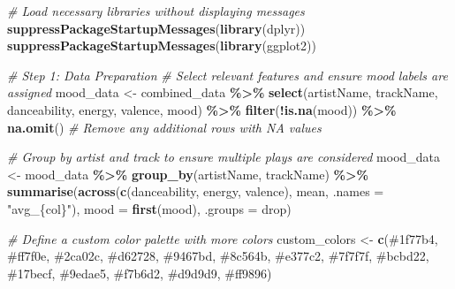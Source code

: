 \documentclass[
]{article}
\newenvironment{Shaded}{\begin{snugshade}}{\end{snugshade}}
\newcommand{\AttributeTok}[1]{\textcolor[rgb]{0.13,0.29,0.53}{#1}}
\newcommand{\CommentTok}[1]{\textcolor[rgb]{0.56,0.35,0.01}{\textit{#1}}}
\newcommand{\FunctionTok}[1]{\textcolor[rgb]{0.13,0.29,0.53}{\textbf{#1}}}
\newcommand{\NormalTok}[1]{#1}
\newcommand{\OtherTok}[1]{\textcolor[rgb]{0.56,0.35,0.01}{#1}}
\newcommand{\SpecialCharTok}[1]{\textcolor[rgb]{0.81,0.36,0.00}{\textbf{#1}}}
\newcommand{\StringTok}[1]{\textcolor[rgb]{0.31,0.60,0.02}{#1}}
\begin{document}
\begin{Shaded}
\begin{Highlighting}[]
\CommentTok{\# Load necessary libraries without displaying messages}
\FunctionTok{suppressPackageStartupMessages}\NormalTok{(}\FunctionTok{library}\NormalTok{(dplyr))}
\FunctionTok{suppressPackageStartupMessages}\NormalTok{(}\FunctionTok{library}\NormalTok{(ggplot2))}

\CommentTok{\# Step 1: Data Preparation}
\CommentTok{\# Select relevant features and ensure mood labels are assigned}
\NormalTok{mood\_data }\OtherTok{\textless{}{-}}\NormalTok{ combined\_data }\SpecialCharTok{\%\textgreater{}\%}
  \FunctionTok{select}\NormalTok{(artistName, trackName, danceability, energy, valence, mood) }\SpecialCharTok{\%\textgreater{}\%}
  \FunctionTok{filter}\NormalTok{(}\SpecialCharTok{!}\FunctionTok{is.na}\NormalTok{(mood)) }\SpecialCharTok{\%\textgreater{}\%}
  \FunctionTok{na.omit}\NormalTok{()  }\CommentTok{\# Remove any additional rows with NA values}

\CommentTok{\# Group by artist and track to ensure multiple plays are considered}
\NormalTok{mood\_data }\OtherTok{\textless{}{-}}\NormalTok{ mood\_data }\SpecialCharTok{\%\textgreater{}\%}
  \FunctionTok{group\_by}\NormalTok{(artistName, trackName) }\SpecialCharTok{\%\textgreater{}\%}
  \FunctionTok{summarise}\NormalTok{(}\FunctionTok{across}\NormalTok{(}\FunctionTok{c}\NormalTok{(danceability, energy, valence), mean, }\AttributeTok{.names =} \StringTok{"avg\_\{col\}"}\NormalTok{),}
            \AttributeTok{mood =} \FunctionTok{first}\NormalTok{(mood),}
            \AttributeTok{.groups =} \StringTok{\textquotesingle{}drop\textquotesingle{}}\NormalTok{)}

\CommentTok{\# Define a custom color palette with more colors}
\NormalTok{custom\_colors }\OtherTok{\textless{}{-}} \FunctionTok{c}\NormalTok{(}\StringTok{\textquotesingle{}\#1f77b4\textquotesingle{}}\NormalTok{, }\StringTok{\textquotesingle{}\#ff7f0e\textquotesingle{}}\NormalTok{, }\StringTok{\textquotesingle{}\#2ca02c\textquotesingle{}}\NormalTok{, }\StringTok{\textquotesingle{}\#d62728\textquotesingle{}}\NormalTok{, }\StringTok{\textquotesingle{}\#9467bd\textquotesingle{}}\NormalTok{, }\StringTok{\textquotesingle{}\#8c564b\textquotesingle{}}\NormalTok{, }
                   \StringTok{\textquotesingle{}\#e377c2\textquotesingle{}}\NormalTok{, }\StringTok{\textquotesingle{}\#7f7f7f\textquotesingle{}}\NormalTok{, }\StringTok{\textquotesingle{}\#bcbd22\textquotesingle{}}\NormalTok{, }\StringTok{\textquotesingle{}\#17becf\textquotesingle{}}\NormalTok{, }\StringTok{\textquotesingle{}\#9edae5\textquotesingle{}}\NormalTok{, }\StringTok{\textquotesingle{}\#f7b6d2\textquotesingle{}}\NormalTok{, }
                   \StringTok{\textquotesingle{}\#d9d9d9\textquotesingle{}}\NormalTok{, }\StringTok{\textquotesingle{}\#ff9896\textquotesingle{}}\NormalTok{)}


\end{Highlighting}
\end{Shaded}
\end{document}

